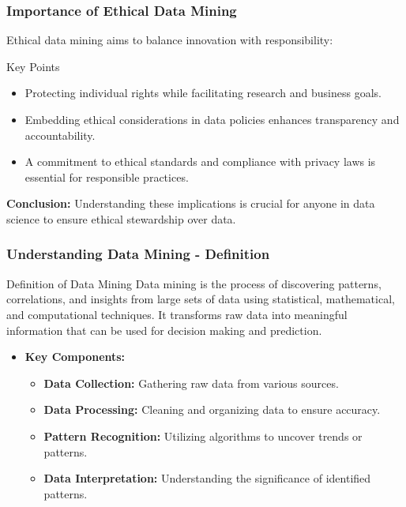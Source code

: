 \documentclass[aspectratio=169]{beamer}
\begin{document}
\begin{frame}[fragile]
    \frametitle{Importance of Ethical Data Mining}
    
    Ethical data mining aims to balance innovation with responsibility:
    
    \begin{block}{Key Points}
        \begin{itemize}
            \item Protecting individual rights while facilitating research and business goals.
            \item Embedding ethical considerations in data policies enhances transparency and accountability.
            \item A commitment to ethical standards and compliance with privacy laws is essential for responsible practices.
        \end{itemize}
    \end{block}
    
    \textbf{Conclusion:} Understanding these implications is crucial for anyone in data science to ensure ethical stewardship over data.
\end{frame}

\begin{frame}[fragile]
    \frametitle{Understanding Data Mining - Definition}
    \begin{block}{Definition of Data Mining}
        Data mining is the process of discovering patterns, correlations, and insights from large sets of data using statistical, mathematical, and computational techniques. It transforms raw data into meaningful information that can be used for decision making and prediction.
    \end{block}

    \begin{itemize}
        \item \textbf{Key Components:}
        \begin{itemize}
            \item \textbf{Data Collection:} Gathering raw data from various sources.
            \item \textbf{Data Processing:} Cleaning and organizing data to ensure accuracy.
            \item \textbf{Pattern Recognition:} Utilizing algorithms to uncover trends or patterns.
            \item \textbf{Data Interpretation:} Understanding the significance of identified patterns.
        \end{itemize}
    \end{itemize}
\end{frame}
\end{document}
